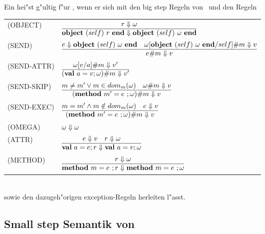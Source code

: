 Ein  hei"st g"ultig f"ur \LTWOO, wenn er sich mit den big step Regeln von \LTWO\ und den Regeln\\[3mm]
  \begin{tabular}{ll}
    \mbox{(OBJECT)}      & $\regel{r \eval \omega}
                                  {\object{self}{r} \eval \object{self}{\omega}}$ \\[5mm]
    \mbox{(SEND)}        & $\regel{e \eval \object{self}{\omega} \quad 
                                     \send{\omega [\object{self}{\omega}/self]}{m} \eval v}
                                  {\send{e}{m} \eval v}$ \\[5mm]
    \mbox{(SEND-ATTR)}   & $\regel{\send{\omega[v/a]}{m} \eval v'}
                                  {\send{(\val{a}{v}\omega)}{m} \eval v'}$ \\[5mm]
    \mbox{(SEND-SKIP)}   & $\regel{m \neq m' \vee m \in dom_m(\omega) \quad
                                   \send{\omega}{m} \eval v}
                                  {\send{(\method{m'}{e}\omega)}{m} \eval v}$ \\[5mm]
    \mbox{(SEND-EXEC)}   & $\regel{m = m' \wedge m \notin dom_m(\omega) \quad e \eval v}
                                  {\send{(\method{m'}{e}\omega)}{m} \eval v}$ \\[5mm]
    \mbox{(OMEGA)}       & $\omega \Downarrow \omega$ \\[3mm]
    \mbox{(ATTR)}        & $\regel{e \eval v \quad r \eval \omega}
                                  {\val{a}{e}r \eval \val{a}{v}\omega}$ \\[5mm]
    \mbox{(METHOD)}      & $\regel{r \eval \omega}
                                  {\method{m}{e}r \eval \method{m}{e}\omega}$
  \end{tabular}\\[7mm]
sowie den dazugeh"origen exception-Regeln herleiten l"asst.


\subsection{Small step Semantik von \LTWOO}

